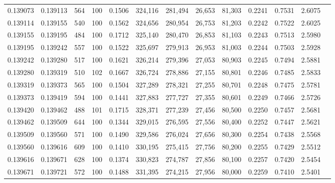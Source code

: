 \begin{tabular}{rrrrrrrrrrrrr}
0.139073 & 0.139113 &   564 & 100 &                                     0.1506 & 324,116 & 281,494 &  26,653 &  81,303 & 0.2241 & 0.7531 & 2.6075 \\
0.139114 & 0.139155 &   540 & 100 &                                     0.1562 & 324,656 & 280,954 &  26,753 &  81,203 & 0.2242 & 0.7522 & 2.6025 \\
0.139155 & 0.139195 &   484 & 100 &                                     0.1712 & 325,140 & 280,470 &  26,853 &  81,103 & 0.2243 & 0.7513 & 2.5980 \\
0.139195 & 0.139242 &   557 & 100 &                                     0.1522 & 325,697 & 279,913 &  26,953 &  81,003 & 0.2244 & 0.7503 & 2.5928 \\
0.139242 & 0.139280 &   517 & 100 &                                     0.1621 & 326,214 & 279,396 &  27,053 &  80,903 & 0.2245 & 0.7494 & 2.5881 \\
0.139280 & 0.139319 &   510 & 102 &                                     0.1667 & 326,724 & 278,886 &  27,155 &  80,801 & 0.2246 & 0.7485 & 2.5833 \\
0.139319 & 0.139373 &   565 & 100 &                                     0.1504 & 327,289 & 278,321 &  27,255 &  80,701 & 0.2248 & 0.7475 & 2.5781 \\
0.139373 & 0.139419 &   594 & 100 &                                     0.1441 & 327,883 & 277,727 &  27,355 &  80,601 & 0.2249 & 0.7466 & 2.5726 \\
0.139420 & 0.139462 &   488 & 101 &                                     0.1715 & 328,371 & 277,239 &  27,456 &  80,500 & 0.2250 & 0.7457 & 2.5681 \\
0.139462 & 0.139509 &   644 & 100 &                                     0.1344 & 329,015 & 276,595 &  27,556 &  80,400 & 0.2252 & 0.7447 & 2.5621 \\
0.139509 & 0.139560 &   571 & 100 &                                     0.1490 & 329,586 & 276,024 &  27,656 &  80,300 & 0.2254 & 0.7438 & 2.5568 \\
0.139560 & 0.139616 &   609 & 100 &                                     0.1410 & 330,195 & 275,415 &  27,756 &  80,200 & 0.2255 & 0.7429 & 2.5512 \\
0.139616 & 0.139671 &   628 & 100 &                                     0.1374 & 330,823 & 274,787 &  27,856 &  80,100 & 0.2257 & 0.7420 & 2.5454 \\
0.139671 & 0.139721 &   572 & 100 &                                     0.1488 & 331,395 & 274,215 &  27,956 &  80,000 & 0.2259 & 0.7410 & 2.5401 \\

\end{tabular}
